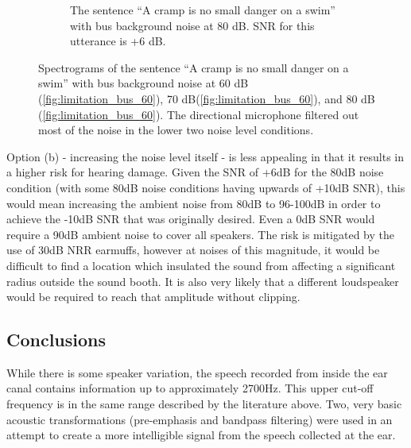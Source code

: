 \documentclass[dissertation,copyright]{uathesis}
\begin{document}
\begin{figure}[h]
\begin{center}
\begin{subfigure}{0.475\textwidth}
  \caption{The sentence ``A cramp is no small danger on a swim'' with bus background noise at 80 dB. SNR for this utterance is +6 dB.}
  \label{fig:limitation_bus_80}
\end{subfigure}
\end{center}
\caption{Spectrograms of the sentence ``A cramp is no small danger on a swim'' with bus background noise at 60 dB (\ref{fig:limitation_bus_60}), 70 dB(\ref{fig:limitation_bus_60}), and 80 dB (\ref{fig:limitation_bus_60}). The directional microphone filtered out most of the noise in the lower two noise level conditions.}
\label{fig:noise_level_limitation}
\end{figure}

Option (b) - increasing the noise level itself - is less appealing in that it results in a higher risk for hearing damage.  Given the SNR of +6dB for the 80dB noise condition (with some 80dB noise conditions having upwards of +10dB SNR), this would mean increasing the ambient noise from 80dB to 96-100dB in order to achieve the -10dB SNR that was originally desired.  Even a 0dB SNR would require a 90dB ambient noise to cover all speakers. The risk is mitigated by the use of 30dB NRR earmuffs, however at noises of this magnitude, it would be difficult to find a location which insulated the sound from affecting a significant radius outside the sound booth.  It is also very likely that a different loudspeaker would be required to reach that amplitude without clipping.

\subsection{Conclusions}

While there is some speaker variation, the speech recorded from inside the ear canal contains information up to approximately 2700Hz.  This upper cut-off frequency is in the same range described by the literature above.  Two, very basic acoustic transformations (pre-emphasis and bandpass filtering) were used in an attempt to create a more intelligible signal from the speech collected at the ear.
\end{document}
